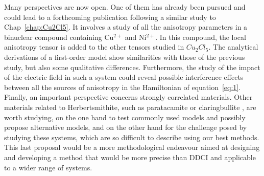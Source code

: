 \documentclass[12pt,a4paper]{report}
\numberwithin{equation}{section}
\begin{document}
Many perspectives are now open. 
One of them has already been pursued and could lead to a forthcoming publication following a similar study to Chap~\ref{chap:Cu2Cl5}.
It involves a study of all the anisotropy parameters in a binuclear compound containing Cu$^{2+}$ and Ni$^{2+}$.
In this compound, the local anisotropy tensor is added to the other tensors studied in $Cu_2Cl_5$.
The analytical derivations of a first-order model show similarities with those of the previous study, but also some qualitative differences.
Furthermore, the study of the impact of the electric field in such a system could reveal possible interference effects between all the sources of anisotropy in the Hamiltonian of equation~\ref{eq:1}. 
Finally, an important perspective concerns strongly correlated materials.
Other materials related to Herbertsmithite, such as paratacamite \cite{mendels_quantum_2007} or claringbullite \cite{feng_claringbullite_2018}, are worth studying, on the one hand to test commonly used models and possibly propose alternative models, and on the other hand for the challenge posed by studying these systems, which are so difficult to describe using our best methods.
This last proposal would be a more methodological endeavour aimed at designing and developing a method that would be more precise than DDCI and applicable to a wider range of systems.


\newpage
\printbibliography
\end{document}
